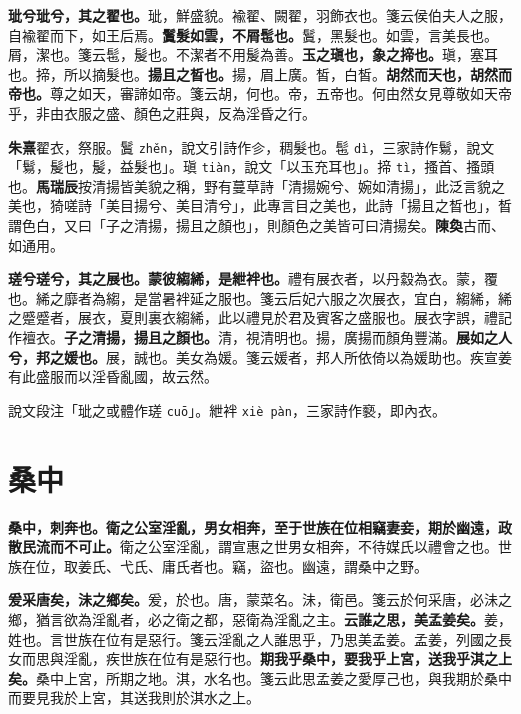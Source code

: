 \textbf{玼兮玼兮，其之翟也。}{\footnotesize 玼，鮮盛貌。褕翟、闕翟，羽飾衣也。箋云侯伯夫人之服，自褕翟而下，如王后焉。}\textbf{鬒髮如雲，不屑髢也。}{\footnotesize 鬒，黑髮也。如雲，言美長也。屑，潔也。箋云髢，髲也。不潔者不用髲為善。}\textbf{玉之瑱也，象之揥也。}{\footnotesize 瑱，塞耳也。揥，所以摘髮也。}\textbf{揚且之晳也。}{\footnotesize 揚，眉上廣。皙，白皙。}\textbf{胡然而天也，胡然而帝也。}{\footnotesize 尊之如天，審諦如帝。箋云胡，何也。帝，五帝也。何由然女見尊敬如天帝乎，非由衣服之盛、顏色之莊與，反為淫昏之行。}

\begin{quoting}\textbf{朱熹}翟衣，祭服。鬒 \texttt{zhěn}，說文引詩作㐱，稠髮也。髢 \texttt{dì}，三家詩作鬄，說文「鬄，髲也，髲，益髮也」。瑱 \texttt{tiàn}，說文「以玉充耳也」。揥 \texttt{tì}，搔首、搔頭也。\textbf{馬瑞辰}按清揚皆美貌之稱，野有蔓草詩「清揚婉兮、婉如清揚」，此泛言貌之美也，猗嗟詩「美目揚兮、美目清兮」，此專言目之美也，此詩「揚且之晳也」，晳謂色白，又曰「子之清揚，揚且之顏也」，則顏色之美皆可曰清揚矣。\textbf{陳奐}古而、如通用。\end{quoting}

\textbf{瑳兮瑳兮，其之展也。蒙彼縐絺，是紲袢也。}{\footnotesize 禮有展衣者，以丹縠為衣。蒙，覆也。絺之靡者為縐，是當暑袢延之服也。箋云后妃六服之次展衣，宜白，縐絺，絺之蹙蹙者，展衣，夏則裏衣縐絺，此以禮見於君及賓客之盛服也。展衣字誤，禮記作襢衣。}\textbf{子之清揚，揚且之顏也。}{\footnotesize 清，視清明也。揚，廣揚而顏角豐滿。}\textbf{展如之人兮，邦之媛也。}{\footnotesize 展，誠也。美女為媛。箋云媛者，邦人所依倚以為媛助也。疾宣姜有此盛服而以淫昏亂國，故云然。}

\begin{quoting}說文段注「玼之或體作瑳 \texttt{cuō}」。紲袢 \texttt{xiè pàn}，三家詩作褻，即內衣。\end{quoting}

\section{桑中}


\textbf{桑中，刺奔也。衛之公室淫亂，男女相奔，至于世族在位相竊妻妾，期於幽遠，政散民流而不可止。}{\footnotesize 衛之公室淫亂，謂宣惠之世男女相奔，不待媒氏以禮會之也。世族在位，取姜氏、弋氏、庸氏者也。竊，盜也。幽遠，謂桑中之野。}

\textbf{爰采唐矣，沬之鄉矣。}{\footnotesize 爰，於也。唐，蒙菜名。沬，衛邑。箋云於何采唐，必沬之鄉，猶言欲為淫亂者，必之衛之都，惡衛為淫亂之主。}\textbf{云誰之思，美孟姜矣。}{\footnotesize 姜，姓也。言世族在位有是惡行。箋云淫亂之人誰思乎，乃思美孟姜。孟姜，列國之長女而思與淫亂，疾世族在位有是惡行也。}\textbf{期我乎桑中，要我乎上宮，送我乎淇之上矣。}{\footnotesize 桑中上宮，所期之地。淇，水名也。箋云此思孟姜之愛厚己也，與我期於桑中而要見我於上宮，其送我則於淇水之上。}

